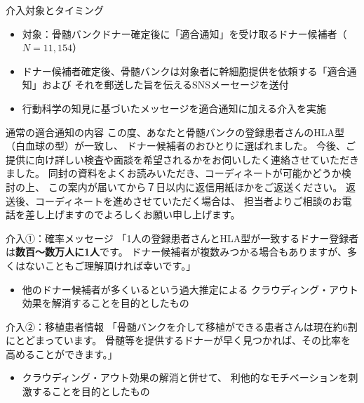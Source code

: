 \documentclass[
      aspectratio=169,
        12pt,
    ]{beamer}
\renewcommand{\textbf}[1]{{\color{DarkBlue}\bfseries#1}}
\providecommand{\tightlist}{%
  \setlength{\itemsep}{0pt}\setlength{\parskip}{0pt}}
\begin{document}
\begin{frame}{介入対象とタイミング}
\protect\hypertarget{ux4ecbux5165ux5bfeux8c61ux3068ux30bfux30a4ux30dfux30f3ux30b0}{}
\begin{itemize}
\tightlist
\item
  対象：骨髄バンクドナー確定後に「適合通知」を受け取るドナー候補者（\(N = 11,154\)）
\item
  ドナー候補者確定後、骨髄バンクは対象者に幹細胞提供を依頼する「適合通知」および
  それを郵送した旨を伝えるSNSメーセージを送付
\item
  行動科学の知見に基づいたメッセージを適合通知に加える介入を実施
\end{itemize}
\end{frame}

\begin{frame}{通常の適合通知の内容}
\protect\hypertarget{ux901aux5e38ux306eux9069ux5408ux901aux77e5ux306eux5185ux5bb9}{}
この度、あなたと骨髄バンクの登録患者さんのHLA型（白血球の型）が一致し、
ドナー候補者のおひとりに選ばれました。
今後、ご提供に向け詳しい検査や面談を希望されるかをお伺いしたく連絡させていただきました。
同封の資料をよくお読みいただき、コーディネートが可能かどうか検討の上、
この案内が届いてから７日以内に返信用紙ほかをご返送ください。
返送後、コーディネートを進めさせていただく場合は、
担当者よりご相談のお電話を差し上げますのでよろしくお願い申し上げます。
\end{frame}

\begin{frame}{介入①：確率メッセージ}
\protect\hypertarget{ux4ecbux5165ux2460ux78baux7387ux30e1ux30c3ux30bbux30fcux30b8}{}
「1人の登録患者さんとHLA型が一致するドナー登録者は\textbf{数百〜数万人に1人}です。
ドナー候補者が複数みつかる場合もありますが、多くはないこともご理解頂ければ幸いです。」

\begin{itemize}
\tightlist
\item
  他のドナー候補者が多くいるという過大推定による
  クラウディング・アウト効果を解消することを目的としたもの
\end{itemize}
\end{frame}

\begin{frame}{介入②：移植患者情報}
\protect\hypertarget{ux4ecbux5165ux2461ux79fbux690dux60a3ux8005ux60c5ux5831}{}
「骨髄バンクを介して移植ができる患者さんは現在約6割にとどまっています。
骨髄等を提供するドナーが早く見つかれば、その比率を高めることができます。」

\begin{itemize}
\tightlist
\item
  クラウディング・アウト効果の解消と併せて、
  利他的なモチベーションを刺激することを目的としたもの
\end{itemize}
\end{frame}
\end{document}
